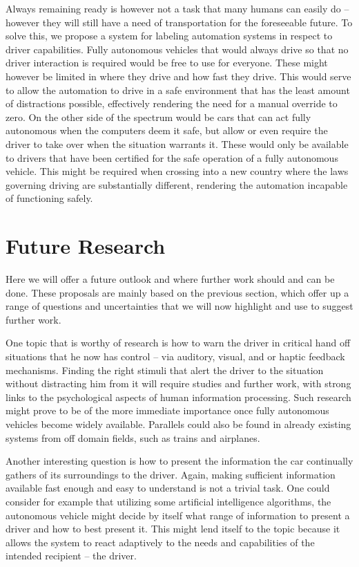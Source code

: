 \documentclass{acm_proc_article-sp}
\begin{document}
Always remaining ready is however not a task that many humans can easily do – however they will still have a need of transportation for the foreseeable future.
To solve this, we propose a system for labeling automation systems in respect to driver capabilities.
Fully autonomous vehicles that would always drive so that no driver interaction is required would be free to use for everyone.
These might however be limited in where they drive and how fast they drive.
This would serve to allow the automation to drive in a safe environment that has the least amount of distractions possible, effectively rendering the need for a manual override to zero.
On the other side of the spectrum would be cars that can act fully autonomous when the computers deem it safe, but allow or even require the driver to take over when the situation warrants it.
These would only be available to drivers that have been certified for the safe operation of a fully autonomous vehicle.
This might be required when crossing into a new country where the laws governing driving are substantially different, rendering the automation incapable of functioning safely.

\section{Future Research}

Here we will offer a future outlook and where further work should and can be done.
These proposals are mainly based on the previous section, which offer up a range of questions and uncertainties that we will now highlight and use to suggest further work.

One topic that is worthy of research is how to warn the driver in critical hand off situations that he now has control – via auditory, visual, and or haptic feedback mechanisms.
Finding the right stimuli that alert the driver to the situation without distracting him from it will require studies and further work, with strong links to the psychological aspects of human information processing.
Such research might prove to be of the more immediate importance once fully autonomous vehicles become widely available.
Parallels could also be found in already existing systems from off domain fields, such as trains and airplanes.

Another interesting question is how to present the information the car continually gathers of its surroundings to the driver.
Again, making sufficient information available fast enough and easy to understand is not a trivial task.
One could consider for example that utilizing some artificial intelligence algorithms, the autonomous vehicle might decide by itself what range of information to present a driver and how to best present it.
This might lend itself to the topic because it allows the system to react adaptively to the needs and capabilities of the intended recipient – the driver.
\end{document}
